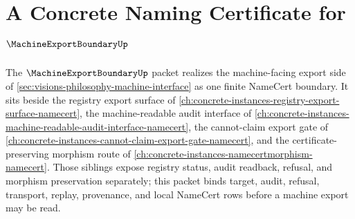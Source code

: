\chapter{A Concrete Naming Certificate for $\MachineExportBoundaryUp$}
\label{ch:concrete-instances-machine-export-boundary-namecert}

The $\MachineExportBoundaryUp$ packet realizes the machine-facing export side of \autoref{sec:visions-philosophy-machine-interface} as one finite NameCert boundary. It sits beside the registry export surface of \autoref{ch:concrete-instances-registry-export-surface-namecert}, the machine-readable audit interface of \autoref{ch:concrete-instances-machine-readable-audit-interface-namecert}, the cannot-claim export gate of \autoref{ch:concrete-instances-cannot-claim-export-gate-namecert}, and the certificate-preserving morphism route of \autoref{ch:concrete-instances-namecertmorphism-namecert}. Those siblings expose registry status, audit readback, refusal, and morphism preservation separately; this packet binds target, audit, refusal, transport, replay, provenance, and local NameCert rows before a machine export may be read.

